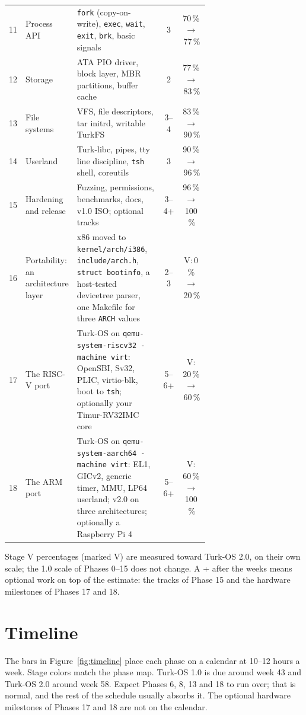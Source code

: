\documentclass[11pt,a4paper]{article}
\begin{document}
\begin{center}
\begin{longtable}{@{}c >{\raggedright\arraybackslash}p{0.24\linewidth} >{\raggedright\arraybackslash}p{0.43\linewidth} c c@{}}
11 & Process API & \texttt{fork} (copy-on-write), \texttt{exec}, \texttt{wait}, \texttt{exit}, \texttt{brk}, basic signals & 3 & 70\,\%\,$\rightarrow$\,77\,\% \\
12 & Storage & ATA PIO driver, block layer, MBR partitions, buffer cache & 2 & 77\,\%\,$\rightarrow$\,83\,\% \\
13 & File systems & VFS, file descriptors, tar initrd, writable TurkFS & 3--4 & 83\,\%\,$\rightarrow$\,90\,\% \\
14 & Userland & Turk-libc, pipes, tty line discipline, \texttt{tsh} shell, coreutils & 3 & 90\,\%\,$\rightarrow$\,96\,\% \\
15 & Hardening and release & Fuzzing, permissions, benchmarks, docs, v1.0 ISO; optional tracks & 3--4+ & 96\,\%\,$\rightarrow$\,100\,\% \\
\midrule
16 & Portability: an architecture layer & x86 moved to \texttt{kernel/arch/i386}, \texttt{include/arch.h}, \texttt{struct bootinfo}, a host-tested devicetree parser, one Makefile for three \texttt{ARCH} values & 2--3 & V:\,0\,\%\,$\rightarrow$\,20\,\% \\
17 & The RISC-V port & Turk-OS on \texttt{qemu-system-riscv32 -machine virt}: OpenSBI, Sv32, PLIC, virtio-blk, boot to \texttt{tsh}; optionally your Timur-RV32IMC core & 5--6+ & V:\,20\,\%\,$\rightarrow$\,60\,\% \\
18 & The ARM port & Turk-OS on \texttt{qemu-system-aarch64 -machine virt}: EL1, GICv2, generic timer, MMU, LP64 userland; v2.0 on three architectures; optionally a Raspberry Pi 4 & 5--6+ & V:\,60\,\%\,$\rightarrow$\,100\,\% \\
\end{longtable}
\end{center}

{\small Stage V percentages (marked V) are measured toward Turk-OS 2.0, on their own scale; the 1.0 scale of
Phases 0--15 does not change. A + after the weeks means optional work on top of the estimate: the tracks of
Phase 15 and the hardware milestones of Phases 17 and 18.\par}

\section{Timeline}

The bars in Figure~\ref{fig:timeline} place each phase on a calendar at 10--12 hours a week. Stage colors match the phase map.
Turk-OS 1.0 is due around week 43 and Turk-OS 2.0 around week 58. Expect Phases 6, 8, 13 and 18 to run over; that is
normal, and the rest of the schedule usually absorbs it. The optional hardware milestones of Phases 17 and 18 are not
on the calendar.
\end{document}
